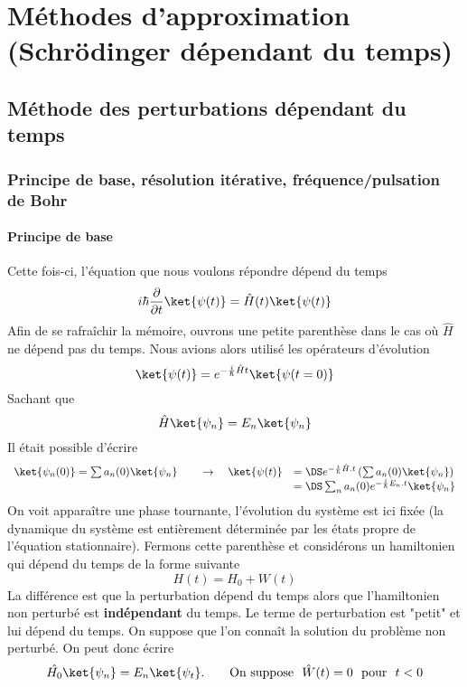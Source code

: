\chapter{Méthodes d'approximation (Schrödinger dépendant du temps)}
\section{Méthode des perturbations dépendant du temps}
	\subsection{Principe de base, résolution itérative, fréquence/pulsation de Bohr}	
		\subsubsection{Principe de base}
	Cette fois-ci, l'équation que nous voulons répondre dépend du temps
	\begin{equation}
	i\hbar\dfrac{\partial}{\partial t}\ket{\psi(t)} = \hat{H}(t)\ket{\psi(t)}
	\end{equation}
	Afin de se rafraîchir la mémoire, ouvrons une petite parenthèse dans le cas où 
	$\hat{H}$ ne dépend pas du temps. Nous avions alors utilisé les opérateurs 
	d'évolution
	\begin{equation}
	\ket{\psi(t)} = e^{-\frac{i}{\hbar}\hat{H}t}\ket{\psi(t=0)}
	\end{equation}
	Sachant que
	\begin{equation}
	\hat{H}\ket{\psi_n} = E_n\ket{\psi_n}
	\end{equation}
	Il était possible d'écrire
	\begin{equation}
	\begin{array}{ll}
	\ket{\psi_n(0)} = \sum a_n(0)\ket{\psi_n}\qquad\rightarrow\quad\ket{\psi(t)} &=\DS 
	e^{-\frac{i}{\hbar}\hat{H}.t}\left(\sum a_n(0)\ket{\psi_n}\right)\\
	&=\DS \sum_n a_n(0)e^{-\frac{i}{\hbar}E_n.t}\ket{\psi_n}
	\end{array}
	\end{equation}
	On voit apparaître une phase tournante, l'évolution du système est ici fixée (la dynamique 
	du système est entièrement déterminée par les états propre de l'équation stationnaire). Fermons 
	cette parenthèse et considérons un hamiltonien qui dépend du temps de la forme suivante
	\begin{equation}
	H(t) = H_0 + W(t)
	\end{equation}
	La différence est que la perturbation 	dépend du temps alors que l'hamiltonien non perturbé est 
	\textbf{indépendant} du temps. Le terme de perturbation est "petit" et lui dépend du temps. 
	On suppose que l'on connaît la solution du problème non perturbé. On peut donc écrire
	\begin{equation}
	\hat{H_0}\ket{\psi_n} = E_n\ket{\psi_t}.\qquad \text{On suppose }\ \hat{W}(t)=0\ \text{ pour }\ t<0
	\end{equation}

